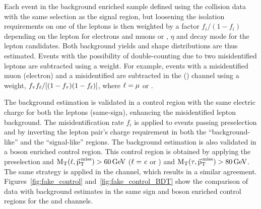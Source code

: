 Each event in the background enriched sample defined using the collision data with the same selection as the signal region, but loosening the isolation requirements on one of the leptons is then weighted by a factor $f_i/(1-f_i)$ depending on the lepton \pt for electrons and muons or \pt, $\eta$ and decay mode for the \tauh lepton candidates. Both background yields and shape distributions are thus estimated. Events with the possibility of double-counting due to two misidentified leptons are subtracted using a weight. For example, events with a misidentified muon (electron) and a misidentified \tauh are subtracted in the \muhad (\ehad) channel using a weight, $f_\tau f_\ell/[(1-f_\tau)(1-f_\ell)]$, where $\ell = \mu$ or \Pe.

The background estimation is validated in a control region with the same electric charge for both the leptons (same-sign), enhancing the misidentified lepton background. The misidentification rate $f_i$ is applied to events passing preselection and by inverting the lepton pair's charge requirement in both the ``background-like'' and the ``signal-like'' regions. The background estimation is also validated in a \PW boson enriched control region. This control region is obtained by applying the preselection and $\text{M}_\mathrm{T}(\ell,{\vec{\text{p}}}_{\mathrm{T}}^{\kern1pt\text{miss}}) > 60 \,\text{Ge\hspace{-.08em}V}$ ($\ell=\textit{e}$ or \Pgm) and $\text{M}_\mathrm{T}(\tau,{\vec{\text{p}}}_{\mathrm{T}}^{\kern1pt\text{miss}}) > 80 \,\text{Ge\hspace{-.08em}V}$. The same strategy is applied in the \ehad channel, which results in a similar agreement. Figures~\ref{fig:fake_control} and~\ref{fig:fake_control_BDT} show the comparison of data with background estimates in the same sign and \PW boson enriched control regions for the \muhad and \ehad channels.

